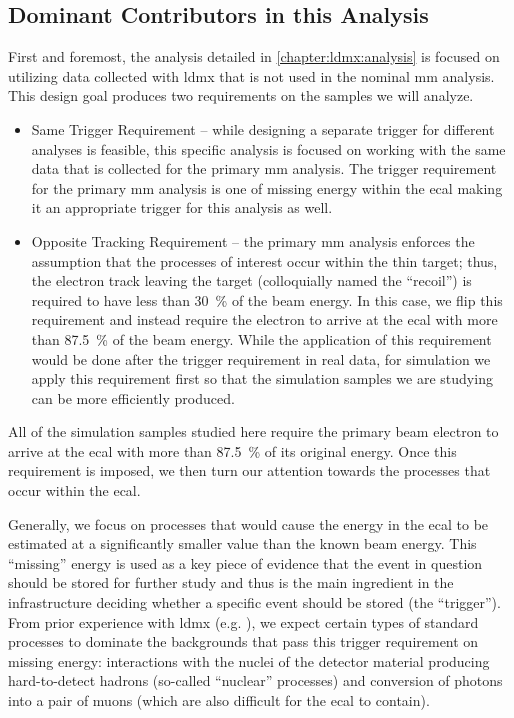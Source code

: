 \subsection{Dominant Contributors in this Analysis}
First and foremost, the analysis detailed in \cref{chapter:ldmx:analysis} is focused
on utilizing data collected with \ac{ldmx} that is not used in the nominal \ac{mm} analysis.
This design goal produces two requirements on the samples we will analyze.
\begin{itemize}
  \item Same Trigger Requirement -- while designing a separate trigger for different analyses
        is feasible, this specific analysis is focused on working with the same data that
        is collected for the primary \ac{mm} analysis.
        The trigger requirement for the primary \ac{mm} analysis is one of missing energy
        within the \ac{ecal} making it an appropriate trigger for this analysis as well.
  \item Opposite Tracking Requirement -- the primary \ac{mm} analysis enforces the assumption that
        the processes of interest occur within the thin target; thus, the electron track leaving
        the target (colloquially named the ``recoil'') is required to have less than
        \qty{30}{\percent} of the beam energy. In this case, we flip this requirement and instead
        require the electron to arrive at the \ac{ecal} with more than \qty{87.5}{\percent} of the
        beam energy. While the application of this requirement would be done after the trigger
        requirement in real data, for simulation we apply this requirement first so that the
        simulation samples we are studying can be more efficiently produced.
\end{itemize}
All of the simulation samples studied here require the primary beam electron to arrive
at the \ac{ecal} with more than \qty{87.5}{\percent} of its original energy.
Once this requirement is imposed, we then turn our attention towards the processes
that occur within the \ac{ecal}.

Generally, we focus on processes that would cause the energy in the \ac{ecal} to be
estimated at a significantly smaller value than the known beam energy.
This ``missing'' energy is used as a key piece of evidence that the event in question
should be stored for further study and thus is the main ingredient in the infrastructure
deciding whether a specific event should be stored (the ``trigger'').
From prior experience with \ac{ldmx} (e.g. \cite{ldmx-whitepaper,ldmx-photon-reject-2020}),
we expect certain types of standard processes to dominate the backgrounds that pass this
trigger requirement on missing energy: interactions with the nuclei of the detector
material producing hard-to-detect hadrons (so-called ``nuclear'' processes) and conversion
of photons into a pair of muons (which are also difficult for the \ac{ecal} to contain).

